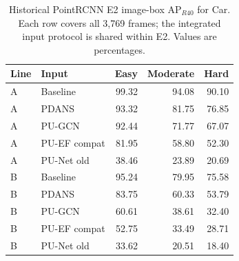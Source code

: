 \begin{table}[!t]\centering\setlength{\tabcolsep}{5pt}
\begin{tabular}{llrrr}\toprule
Line & Input & Easy & Moderate & Hard\\\midrule

A & Baseline & 99.32 & 94.08 & 90.10\\

A & PDANS & 93.32 & 81.75 & 76.85\\

A & PU-GCN & 92.44 & 71.77 & 67.07\\

A & PU-EF compat & 81.95 & 58.80 & 52.30\\

A & PU-Net old & 38.46 & 23.89 & 20.69\\

\midrule

B & Baseline & 95.24 & 79.95 & 75.58\\

B & PDANS & 83.75 & 60.33 & 53.79\\

B & PU-GCN & 60.61 & 38.61 & 32.40\\

B & PU-EF compat & 52.75 & 33.49 & 28.71\\

B & PU-Net old & 33.62 & 20.51 & 18.40\\

\bottomrule\end{tabular}
\caption{Historical PointRCNN E2 image-box AP$_{R40}$ for Car. Each row covers all 3,769 frames; the integrated input protocol is shared within E2. Values are percentages.}\label{tab:k-e2-bbox}\end{table}

